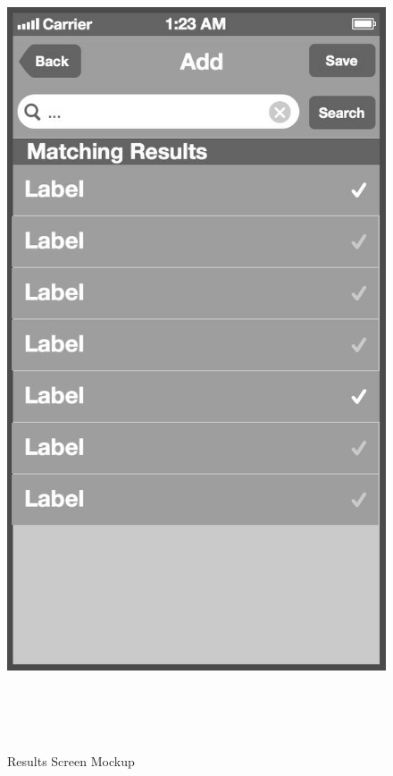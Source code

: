 \begin{figure}[ptb]
\begin{minipage}[b]{0.45\linewidth}
        \includegraphics[width=0.8025\linewidth]{figures/Screen_3_bw.jpg}
        \caption[List Screen to add to Comparison List Mockup]{Results Screen Mockup}
        \label{fig:AlternativeListScreen}
    \end{minipage}
    \\
    \\
    \\
    \begin{minipage}[b]{0.45\linewidth}
        \centering

\end{minipage}
\end{figure}
